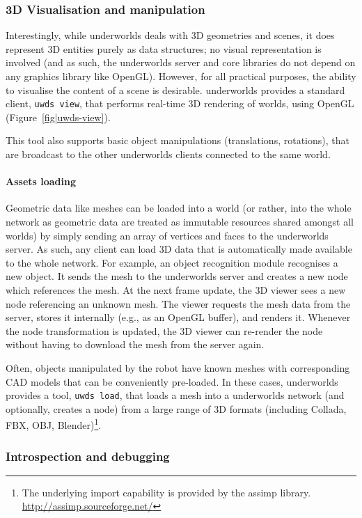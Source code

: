 \documentclass[conference]{IEEEtran}
\newcommand{\eg}{e.g.,\xspace}
\newcommand{\uwds}{{\sc underworlds}\xspace}
\begin{document}
\subsubsection{3D Visualisation and manipulation}

Interestingly, while \uwds deals with 3D geometries and scenes, it does
represent 3D entities purely as data structures; no visual representation is
involved (and as such, the \uwds server and core libraries do not depend on any
graphics library like OpenGL). However, for all practical purposes, the ability
to visualise the content of a scene is desirable. \uwds provides a standard
client, {\tt uwds view}, that performs real-time 3D rendering of worlds,
using OpenGL (Figure~\ref{fig|uwds-view}).

This tool also supports basic object manipulations (translations, rotations),
that are broadcast to the other \uwds clients connected to the same world.

\paragraph*{Assets loading}

Geometric data like meshes can be loaded into a world (or rather, into the whole
network as geometric data are treated as immutable resources shared amongst all
worlds) by simply sending an array of vertices and faces to the \uwds server.
As such, any client can load 3D data that is automatically made available to the
whole network. For example, an object recognition module recognises a new
object. It sends the mesh to the \uwds server and creates a new node which
references the mesh. At the next frame update, the 3D viewer sees a new node
referencing an unknown mesh. The viewer requests the mesh data from the
server, stores it internally (\eg as an OpenGL buffer), and renders it. Whenever
the node transformation is updated, the 3D viewer can re-render the node without
having to download the mesh from the server again.

Often, objects manipulated by the robot have known meshes with corresponding CAD
models that can be conveniently pre-loaded. In these cases, \uwds provides a
tool, {\tt uwds load}, that loads a mesh into a \uwds network (and optionally,
creates a node) from a large range of 3D formats (including Collada, FBX, OBJ,
Blender)\footnote{The underlying import
capability is provided by the {\sc assimp} library.
\url{http://assimp.sourceforge.net/}}.

\subsubsection{Introspection and debugging}
\end{document}
